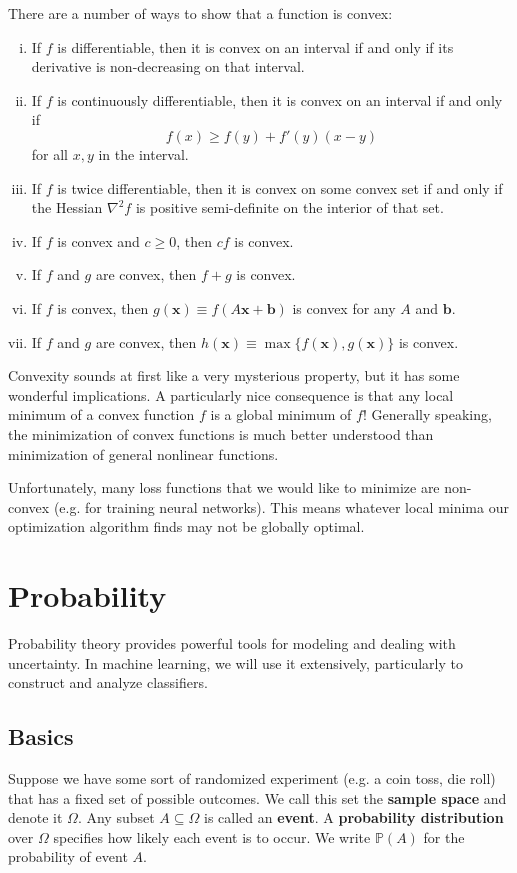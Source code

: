 \documentclass{article}
\renewcommand{\vec}[1]{\mathbf{#1}}
\newcommand{\pr}[1]{\mathbb{P}(#1)}
\newcommand{\term}[1]{\textbf{#1}}
\begin{document}
There are a number of ways to show that a function is convex:
\begin{enumerate}[(i)]
\item If $f$ is differentiable, then it is convex on an interval if and only if its derivative is non-decreasing on that interval.
\item If $f$ is continuously differentiable, then it is convex on an interval if and only if
\[f(x) \geq f(y) + f'(y)(x-y)\]
for all $x,y$ in the interval.
\item If $f$ is twice differentiable, then it is convex on some convex set if and only if the Hessian $\nabla^2 f$ is positive semi-definite on the interior of that set.
\item If $f$ is convex and $c \geq 0$, then $cf$ is convex.
\item If $f$ and $g$ are convex, then $f+g$ is convex.
\item If $f$ is convex, then $g(\vec{x}) \equiv f(A\vec{x} + \vec{b})$ is convex for any $A$ and $\vec{b}$.
\item If $f$ and $g$ are convex, then $h(\vec{x}) \equiv \max\{f(\vec{x}), g(\vec{x})\}$ is convex.
\end{enumerate}

Convexity sounds at first like a very mysterious property, but it has some wonderful implications. A particularly nice consequence is that any local minimum of a convex function $f$ is a global minimum of $f$! Generally speaking, the minimization of convex functions is much better understood than minimization of general nonlinear functions.

Unfortunately, many loss functions that we would like to minimize are non-convex (e.g. for training neural networks). This means whatever local minima our optimization algorithm finds may not be globally optimal.

\newpage
\section{Probability}
Probability theory provides powerful tools for modeling and dealing with uncertainty. In machine learning, we will use it extensively, particularly to construct and analyze classifiers.

\subsection{Basics}
Suppose we have some sort of randomized experiment (e.g. a coin toss, die roll) that has a fixed set of possible outcomes.  We call this set the \term{sample space} and denote it $\Omega$. Any subset $A \subseteq \Omega$ is called an \term{event}.
A \term{probability distribution} over $\Omega$ specifies how likely each event is to occur. We write $\pr{A}$ for the probability of event $A$.
\end{document}

